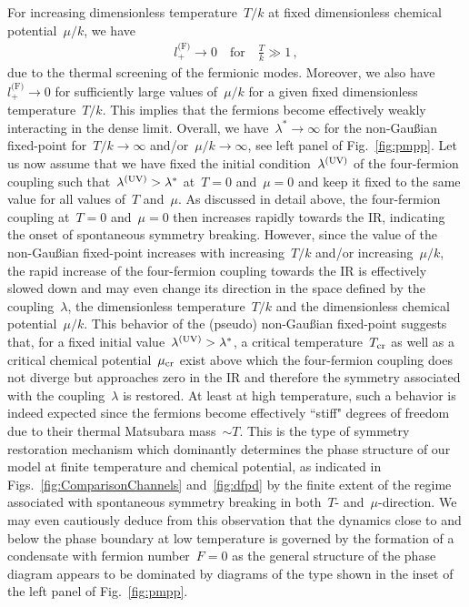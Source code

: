 \documentclass[prd,english,preprintnumbers,amsmath,amssymb,nofootinbib,twocolumn,superscriptaddress]{revtex4-1}
\newcommand{\be}{\begin{eqnarray}}
\newcommand{\ee}{\end{eqnarray}}
\begin{document}
{{For increasing dimensionless temperature~$T/k$ 
at fixed dimensionless chemical potential~$\mu/k$, we have  
%
\be
l^{\text{(F)}}_{+}\to 0\quad\text{for}\quad {\frac{T}{k}} \gg 1\,,
\ee
%
due to the thermal screening of the fermionic
modes. Moreover, we also have~$l^{\text{(F)}}_{+} \to 0$ for sufficiently large values 
of~$\mu/k$ for a given fixed dimensionless temperature~$T/k$. This implies that the fermions become effectively weakly interacting
in the dense limit. Overall, we have~$\lambda^{\ast}\to\infty$ for the 
non-Gau\ss ian fixed-point 
for~$T/k\to \infty$ and/or~$\mu/k\to\infty$, see left panel of Fig.~\ref{fig:pmpp}. 
Let us now assume that we have fixed the initial condition~$\lambda^{(\rm UV)}$ of the
four-fermion coupling such that~$\lambda^{(\rm UV)} > \lambda^{\ast}$ at~$T=0$ and~$\mu=0$ and
keep it fixed to the same value for all values of~$T$ and~$\mu$.
As discussed in detail above, the four-fermion
coupling at~$T=0$ and~$\mu=0$ then increases rapidly towards the IR, indicating the onset of spontaneous symmetry breaking. 
However, since the value of the non-Gau\ss ian fixed-point increases with increasing~$T/k$ and/or 
increasing~$\mu/k$, the rapid increase of the four-fermion coupling towards the IR is effectively slowed down 
and may even change its direction in the space defined by the coupling~$\lambda$, the dimensionless temperature~$T/k$
and the dimensionless chemical potential~$\mu/k$.
This behavior of the (pseudo) non-Gau\ss ian fixed-point suggests that, for a fixed initial value~$\lambda^{(\rm UV)}>\lambda^{\ast}$,
a critical temperature~$T_{\rm cr}$ as well as a critical chemical potential~$\mu_{\rm cr}$
exist above which the four-fermion coupling 
does not diverge but approaches zero in the IR and therefore the symmetry associated with the coupling~$\lambda$
is restored. At least at high temperature, 
such a behavior is indeed expected since the fermions become effectively ``stiff" 
degrees of freedom due to their thermal Matsubara mass~$\sim T$. This is the type of symmetry restoration mechanism 
which dominantly determines the phase structure of our model at finite temperature and chemical potential, as indicated
in Figs.~\ref{fig:ComparisonChannels} and~\ref{fig:dfpd}
by the finite extent of the regime associated with spontaneous symmetry breaking in both~$T$- and~$\mu$-direction.
We may even cautiously deduce from this observation that the dynamics {close to 
and below the phase boundary at low temperature}
is governed by the formation of a condensate with fermion number~$F=0$ as the general structure of the phase diagram
appears to be dominated by diagrams of the type shown in the inset of the left panel of Fig.~\ref{fig:pmpp}.

}}
\end{document}
